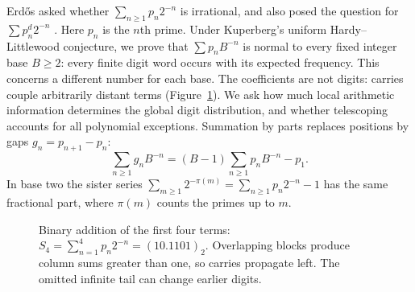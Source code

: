 \documentclass[11pt,a4paper]{article}
\begin{document}
Erd\H os asked whether $\sum_{n\ge1}p_n2^{-n}$ is irrational, and
also posed the question for $\sum p_n^d2^{-n}$ \cite[p.~103]{erdos1988}.
Here $p_n$ is the $n$th prime. Under Kuperberg's uniform
Hardy--Littlewood conjecture, we prove that $\sum p_nB^{-n}$ is normal
to every fixed integer base $B\ge2$: every finite digit word occurs with
its expected frequency. This concerns a different number for each base.
The coefficients are not digits: carries couple arbitrarily distant terms
(Figure~\ref{fig:carries}).
We ask how much local arithmetic information determines the global digit
distribution, and whether telescoping accounts for all polynomial exceptions.
Summation by parts replaces positions by gaps $g_n=p_{n+1}-p_n$:
\begin{equation}\label{eq:abelbasic}
 \sum_{n\ge1}g_nB^{-n}=(B-1)\sum_{n\ge1}p_nB^{-n}-p_1.
\end{equation}
In base two the sister series $\sum_{m\ge1}2^{-\pi(m)}
=\sum_{n\ge1}p_n2^{-n}-1$ has the same fractional part,
where $\pi(m)$ counts the primes up to $m$.

\begin{figure}[t]
\centering
{}
\caption{Binary addition of the first four terms:
$S_4=\sum_{n=1}^4p_n2^{-n}=(10.1101)_2$.
Overlapping blocks produce column sums greater than one, so carries
propagate left. The omitted infinite tail can change earlier digits.}
\label{fig:carries}
\end{figure}
\end{document}
